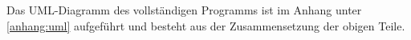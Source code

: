 Das UML-Diagramm des vollständigen Programms ist im Anhang unter \ref{anhang:uml} aufgeführt und besteht aus der Zusammensetzung der obigen Teile.


